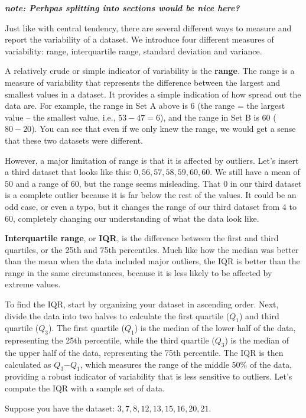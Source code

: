\documentclass[
  letterpaper,
  DIV=11,
  numbers=noendperiod]{scrreprt}
\begin{document}
\textbf{\emph{note: Perhpas splitting into sections would be nice
here?}}

Just like with central tendency, there are several different ways to
measure and report the variability of a dataset. We introduce four
different measures of variability: range, interquartile range, standard
deviation and variance.

A relatively crude or simple indicator of variability is the
\textbf{range}. The range is a measure of variability that represents
the difference between the largest and smallest values in a dataset. It
provides a simple indication of how spread out the data are. For
example, the range in Set A above is 6 (the range = the largest value --
the smallest value, i.e., \(53 - 47 = 6\)), and the range in Set B is
\(60\) (\(80 - 20\)). You can see that even if we only knew the range,
we would get a sense that these two datasets were different.

However, a major limitation of range is that it is affected by outliers.
Let's insert a third dataset that looks like this:
\(0, 56, 57, 58, 59, 60, 60\). We still have a mean of \(50\) and a
range of \(60\), but the range seems misleading. That \(0\) in our third
dataset is a complete outlier because it is far below the rest of the
values. It could be an odd case, or even a typo, but it changes the
range of our third dataset from \(4\) to \(60\), completely changing our
understanding of what the data look like.

\textbf{Interquartile range}, or \textbf{IQR}, is the difference between
the first and third quartiles, or the 25th and 75th percentiles. Much
like how the median was better than the mean when the data included
major outliers, the IQR is better than the range in the same
circumstances, because it is less likely to be affected by extreme
values.

To find the IQR, start by organizing your dataset in ascending order.
Next, divide the data into two halves to calculate the first quartile
(\(Q_1\)) and third quartile (\(Q_3\)). The first quartile (\(Q_1\)) is
the median of the lower half of the data, representing the 25th
percentile, while the third quartile (\(Q_3\)) is the median of the
upper half of the data, representing the 75th percentile. The IQR is
then calculated as \(Q_3\)−\(Q_1\), which measures the range of the
middle 50\% of the data, providing a robust indicator of variability
that is less sensitive to outliers. Let's compute the IQR with a sample
set of data.

Suppose you have the dataset: \(3, 7, 8, 12, 13, 15, 16, 20, 21\).
\end{document}
